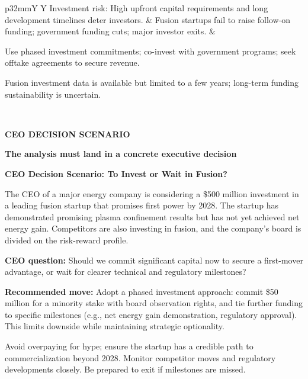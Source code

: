 \documentclass[10pt,a4paper]{article}
\begin{document}
\begin{tabularx}{\linewidth}{p{32mm}Y Y}
{\scriptsize Investment risk: High upfront capital requirements and long development timelines deter investors.} & {\scriptsize Fusion startups fail to raise follow-on funding; government funding cuts; major investor exits.} & {\scriptsize Use phased investment commitments; co-invest with government programs; seek offtake agreements to secure revenue.\par\textcolor{BOMuted}{Fusion investment data is available but limited to a few years; long-term funding sustainability is uncertain.}} \\[6pt]
\end{tabularx}

\clearpage
{\textcolor{BOBlue}{\scriptsize\bfseries CEO DECISION SCENARIO}}\par\vspace{-1pt}
{\Large\sffamily\bfseries\color{BONavy} The analysis must land in a concrete executive decision}\par\vspace{4pt}
\vspace{2pt}{\color{BOBright}\rule{\linewidth}{1pt}}\vspace{5pt}
{\color{BOBlue}\sffamily\bfseries CEO Decision Scenario: To Invest or Wait in Fusion?}\par\vspace{2pt}
{\small The CEO of a major energy company is considering a \$500 million investment in a leading fusion startup that promises first power by 2028. The startup has demonstrated promising plasma confinement results but has not yet achieved net energy gain. Competitors are also investing in fusion, and the company's board is divided on the risk-reward profile.}\par
{\small\textbf{CEO question:} Should we commit significant capital now to secure a first-mover advantage, or wait for clearer technical and regulatory milestones?}\par
{\small\textbf{Recommended move:} Adopt a phased investment approach: commit \$50 million for a minority stake with board observation rights, and tie further funding to specific milestones (e.g., net energy gain demonstration, regulatory approval). This limits downside while maintaining strategic optionality.}\par
{\scriptsize\color{BOMuted} Avoid overpaying for hype; ensure the startup has a credible path to commercialization beyond 2028. Monitor competitor moves and regulatory developments closely. Be prepared to exit if milestones are missed.}\par\vspace{8pt}
\end{document}

